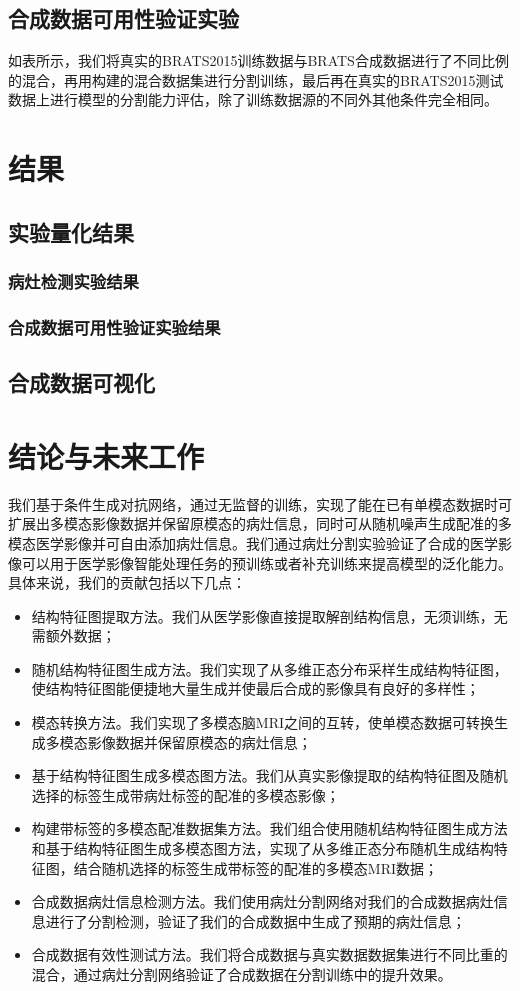 \documentclass[letterpaper]{article} %
\begin{document}
\subsection{合成数据可用性验证实验}
如表所示，我们将真实的BRATS2015训练数据与BRATS合成数据进行了不同比例的混合，再用构建的混合数据集进行分割训练，最后再在真实的BRATS2015测试数据上进行模型的分割能力评估，除了训练数据源的不同外其他条件完全相同。

\section{结果}
\subsection{实验量化结果}
\subsubsection{病灶检测实验结果}

\subsubsection{合成数据可用性验证实验结果}

\subsection{合成数据可视化}

\section{结论与未来工作}
我们基于条件生成对抗网络，通过无监督的训练，实现了能在已有单模态数据时可扩展出多模态影像数据并保留原模态的病灶信息，同时可从随机噪声生成配准的多模态医学影像并可自由添加病灶信息。我们通过病灶分割实验验证了合成的医学影像可以用于医学影像智能处理任务的预训练或者补充训练来提高模型的泛化能力。具体来说，我们的贡献包括以下几点：
\begin{itemize}
	\item 结构特征图提取方法。我们从医学影像直接提取解剖结构信息，无须训练，无需额外数据；
	\item 随机结构特征图生成方法。我们实现了从多维正态分布采样生成结构特征图，使结构特征图能便捷地大量生成并使最后合成的影像具有良好的多样性；
	\item 模态转换方法。我们实现了多模态脑MRI之间的互转，使单模态数据可转换生成多模态影像数据并保留原模态的病灶信息；
	\item 基于结构特征图生成多模态图方法。我们从真实影像提取的结构特征图及随机选择的标签生成带病灶标签的配准的多模态影像；
	\item 构建带标签的多模态配准数据集方法。我们组合使用随机结构特征图生成方法和基于结构特征图生成多模态图方法，实现了从多维正态分布随机生成结构特征图，结合随机选择的标签生成带标签的配准的多模态MRI数据；
	\item 合成数据病灶信息检测方法。我们使用病灶分割网络对我们的合成数据病灶信息进行了分割检测，验证了我们的合成数据中生成了预期的病灶信息；
	\item 合成数据有效性测试方法。我们将合成数据与真实数据数据集进行不同比重的混合，通过病灶分割网络验证了合成数据在分割训练中的提升效果。
\end{itemize}
\end{document}

